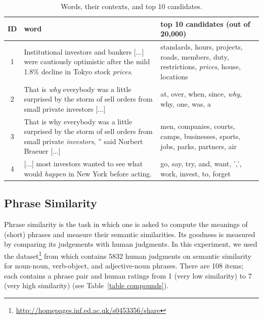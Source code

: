 \documentclass[11pt]{article}
\begin{document}
\begin{table}[!ht]
	\center
	\begin{tabular}{c|p{9cm}|p{6cm}}
		ID & word & top 10 candidates (out of 20,000) \\ \hline
		
		1 & Institutional investors and bankers [...] were cautiously optimistic after the mild 1.8\% decline in Tokyo stock \textit{prices}. & standards, hours, projects, roads,  members, duty, restrictions, \textit{prices}, house, locations \\ \hline
		
		2 & That is \textit{why} everybody was a little surprised by the storm of sell orders from small private investors [...] & at, over, when, since, \textit{why}, why, one, was, a \\ \hline

		3 & That is why everybody was a little surprised by the storm of sell orders from small private \textit{investors}, '' said Norbert Braeuer [...] & men, companies, courts, camps, businesses, sports, jobs, parks, partners, air \\ \hline
	
		4 & [...] most investors wanted to see what would \textit{happen} in New York before acting. &  go, say, try, and, want, ',', work, invest, to, forget 
	
	\end{tabular}
	\caption{Words, their contexts, and top 10 candidates.}
	\label{table top 10}
\end{table}



	
\subsection{Phrase Similarity}
\label{subsection phrase similarity}

Phrase similarity is the task in which one is asked to compute the meanings of (short) phrases 
and measure their semantic similarities. Its goodness is measured by comparing its judgements with 
human judgments. In this experiment, we used the dataset\footnote{\url{http://homepages.inf.ed.ac.uk/s0453356/share}} from  which contains 5832 human judgments on semantic similarity 
for noun-noun, verb-object, and adjective-noun phrases. There are 108 items; each contains a phrase pair
and human ratings from 1 (very low similarity) to 7 (very high similarity) (see Table~\ref{table compounds}).
\end{document}
